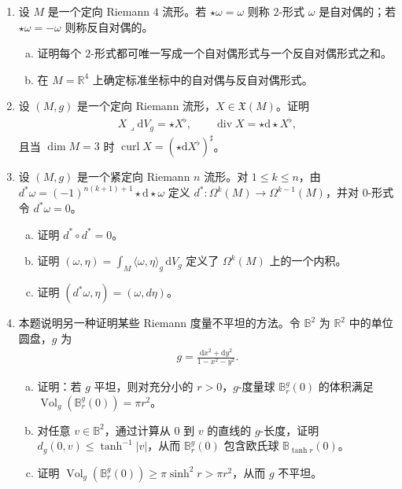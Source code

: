 \documentclass[../../main.tex]{subfiles}
\begin{document}
\begin{enumerate}
\item\label{exercise:ch16-20} 设 $M$ 是一个定向 Riemann $4$ 流形。若 $\star\omega=\omega$ 则称 $2$-形式 $\omega$ 是自对偶的；若 $\star\omega=-\omega$ 则称反自对偶的。
\begin{enumerate}[(a)]
\item 证明每个 $2$-形式都可唯一写成一个自对偶形式与一个反自对偶形式之和。
\item 在 $M=\mathbb{R}^4$ 上确定标准坐标中的自对偶与反自对偶形式。
\end{enumerate}

\item\label{exercise:ch16-21} 设 $(M,g)$ 是一个定向 Riemann 流形，$X\in\mathfrak X(M)$。证明
\begin{align*}
X\lrcorner\mathrm{d}V_g=\star X^\flat,\qquad \operatorname{div}X=\star\mathrm{d}\star X^\flat,
\end{align*}
且当 $\dim M=3$ 时 $\operatorname{curl}X=(\star\mathrm{d}X^\flat)^\sharp$。

\item\label{exercise:ch16-22} 设 $(M,g)$ 是一个紧定向 Riemann $n$ 流形。对 $1\leqslant k\leqslant n$，由 $d^*\omega=(-1)^{n(k+1)+1}\star\mathrm{d}\star\omega$ 定义 $d^*:\Omega^k(M)\to\Omega^{k-1}(M)$，并对 $0$-形式令 $d^*\omega=0$。
\begin{enumerate}[(a)]
\item 证明 $d^*\circ d^*=0$。
\item 证明 $(\omega,\eta)=\int_M\langle\omega,\eta\rangle_g\,\mathrm{d}V_g$ 定义了 $\Omega^k(M)$ 上的一个内积。
\item 证明 $(d^*\omega,\eta)=(\omega,d\eta)$。
\end{enumerate}

\item\label{exercise:ch16-23} 本题说明另一种证明某些 Riemann 度量不平坦的方法。令 $\mathbb{B}^2$ 为 $\mathbb{R}^2$ 中的单位圆盘，$g$ 为
\begin{align*}
g=\frac{\mathrm{d}x^2+\mathrm{d}y^2}{1-x^2-y^2}.
\end{align*}
\begin{enumerate}[(a)]
\item 证明：若 $g$ 平坦，则对充分小的 $r>0$，$g$-度量球 $\mathbb B_r^g(0)$ 的体积满足 $\operatorname{Vol}_g(\mathbb B_r^g(0))=\pi r^2$。
\item 对任意 $v\in\mathbb{B}^2$，通过计算从 $0$ 到 $v$ 的直线的 $g$-长度，证明 $d_g(0,v)\leqslant\tanh^{-1}|v|$，从而 $\mathbb B_r^g(0)$ 包含欧氏球 $\mathbb B_{\tanh r}(0)$。
\item 证明 $\operatorname{Vol}_g(\mathbb B_r^g(0))\geqslant\pi\sinh^2 r>\pi r^2$，从而 $g$ 不平坦。
\end{enumerate}
\end{enumerate}
\end{document}
